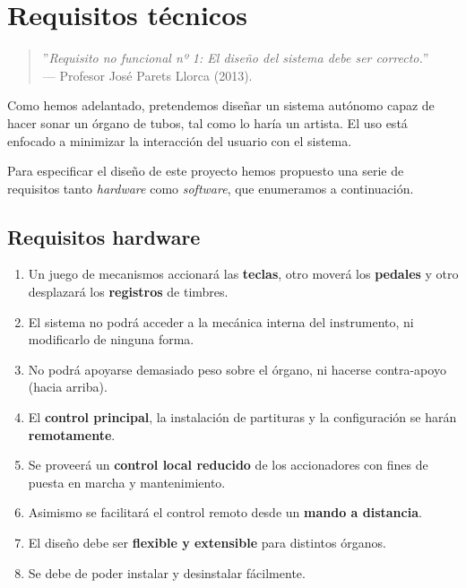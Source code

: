 \chapter{Requisitos técnicos}
\label{cap:capitulo_2}

\begin{quote}
	\small \flushright ''\textit{Requisito no funcional nº 1: El diseño del sistema debe ser correcto.}'' \\
	--- Profesor José Parets Llorca (2013).
\end{quote}

\vspace{8em}

Como hemos adelantado, pretendemos diseñar un sistema autónomo capaz de hacer sonar un órgano de tubos, tal como lo haría un artista. El uso está enfocado a minimizar la interacción del usuario con el sistema. 

Para especificar el diseño de este proyecto hemos propuesto una serie de requisitos tanto \textit{hardware} como \textit{software}, que enumeramos a continuación.

\newpage 

\section{Requisitos hardware}

\begin{enumerate}
	
	\item Un juego de mecanismos accionará las \textbf{teclas}, otro moverá los \textbf{pedales} y otro desplazará los \textbf{registros} de timbres.
	
	\item El sistema no podrá acceder a la mecánica interna del instrumento, ni modificarlo de ninguna forma.
	
	\item No podrá apoyarse demasiado peso sobre el órgano, ni hacerse contra-apoyo (hacia arriba).
	
	\item El \textbf{control principal}, la instalación de partituras y la configuración se harán \textbf{remotamente}.
	
	\item Se proveerá un \textbf{control local reducido} de los accionadores con fines de puesta en marcha y mantenimiento.
	
	\item Asimismo se facilitará el control remoto desde un \textbf{mando a distancia}.
	
	\item El diseño debe ser \textbf{flexible y extensible} para distintos órganos.
	
	\item Se debe de poder instalar y desinstalar fácilmente.
	
\end{enumerate}

